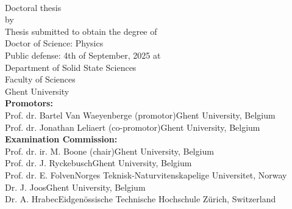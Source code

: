 \thispagestyle{empty}

\fontsize{12pt}{14pt}\selectfont

\vspace*{-1.5cm}
\noindent{}
\vspace{0.0cm}
\fontsize{20pt}{20pt}\selectfont
\begin{center}
{\textsc{\phdtitle}}\\
\end{center}

\fontsize{16pt}{16pt}\selectfont

\null\hfill Doctoral thesis\\
\null\hfill by \phdauthor\\
\vfill
{}
\fontsize{12pt}{14pt}\selectfont
Thesis submitted to obtain the degree of\\
Doctor of Science: Physics\\
\newline
Public defense: 4th of September, 2025 at\\
Department of Solid State Sciences\\
Faculty of Sciences\\
Ghent University\\


\fontsize{10pt}{12pt}\selectfont
\textbf{Promotors:}\\
Prof. dr. Bartel Van Waeyenberge (promotor)\hfill Ghent University, Belgium\\
Prof. dr. Jonathan Leliaert (co-promotor)\hfill Ghent University, Belgium\\
\newline
\textbf{Examination Commission:}\\
Prof. dr. ir. M. Boone (chair)\hfill Ghent University, Belgium\\
Prof. dr. J. Ryckebusch\hfill Ghent University, Belgium\\
Prof. dr. E. Folven\hfill Norges Teknisk-Naturvitenskapelige Universitet, Norway\\%
Dr. J. Joos\hfill Ghent University, Belgium\\
Dr. A. Hrabec\hfill Eidgen\"ossische Technische Hochschule Z\"urich, Switzerland\\%

\newpage
